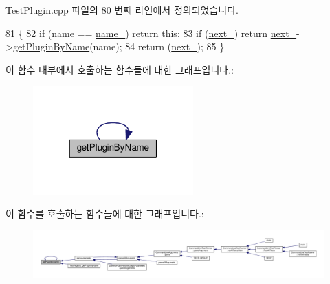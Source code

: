 Test\+Plugin.\+cpp 파일의 80 번째 라인에서 정의되었습니다.


\begin{DoxyCode}
81 \{
82     \textcolor{keywordflow}{if} (name == \hyperlink{class_test_plugin_aac73c86e1e892f392d1fc423e25f51a8}{name\_}) \textcolor{keywordflow}{return} \textcolor{keyword}{this};
83     \textcolor{keywordflow}{if} (\hyperlink{class_test_plugin_a9461650e936ee3765377081fb8bc15dc}{next\_}) \textcolor{keywordflow}{return} \hyperlink{class_test_plugin_a9461650e936ee3765377081fb8bc15dc}{next\_}->\hyperlink{class_test_plugin_a51f70cec62bf873bdae6cc7514437343}{getPluginByName}(name);
84     \textcolor{keywordflow}{return} (\hyperlink{class_test_plugin_a9461650e936ee3765377081fb8bc15dc}{next\_});
85 \}
\end{DoxyCode}


이 함수 내부에서 호출하는 함수들에 대한 그래프입니다.\+:
\nopagebreak
\begin{figure}[H]
\begin{center}
\leavevmode
\includegraphics[width=175pt]{class_test_plugin_a51f70cec62bf873bdae6cc7514437343_cgraph}
\end{center}
\end{figure}




이 함수를 호출하는 함수들에 대한 그래프입니다.\+:
\nopagebreak
\begin{figure}[H]
\begin{center}
\leavevmode
\includegraphics[width=350pt]{class_test_plugin_a51f70cec62bf873bdae6cc7514437343_icgraph}
\end{center}
\end{figure}


